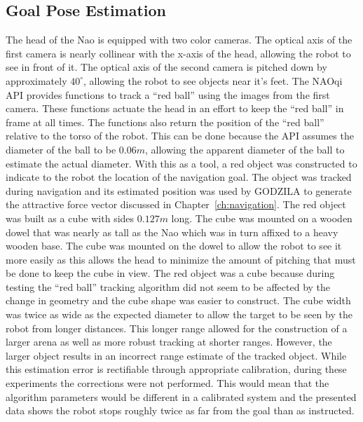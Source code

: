 \subsection{Goal Pose Estimation} \label{subsec:goal_pose_est}
The head of the Nao is equipped with two color cameras. The optical axis of the
first camera is nearly collinear with the x-axis of the head, allowing the
robot to see in front of it. The optical axis of the second camera is pitched
down by approximately $40^\circ$, allowing the robot to see objects near it's feet.
The NAOqi API provides functions to track a ``red ball'' using the images from the first camera. 
These functions actuate the head in an effort to keep the ``red ball'' in frame at all times.
The functions also return the position of the ``red ball'' relative to the torso of the robot.
This can be done because the API assumes the diameter of the ball to be $0.06 m$, allowing
the apparent diameter of the ball to estimate the actual diameter.
With this as a tool, a red object was constructed to indicate to the robot the location of the
navigation goal. The object was tracked during navigation and its estimated position was used
by GODZILA to generate the attractive force vector discussed in Chapter~\ref{ch:navigation}.
The red object was built as a cube with sides $0.127 m$ long. The cube was
mounted on a wooden dowel that was nearly as tall as the Nao which was in turn
affixed to a heavy wooden base.
The cube was mounted on the dowel to allow the robot to see it more easily as this
allows the head to minimize the amount of pitching that must be done to keep the cube in view.
The red object was a cube because during testing the ``red ball'' tracking algorithm did not
seem to be affected by the change in geometry and the cube shape was easier to construct.
The cube width was twice as wide as the expected diameter to allow the target to be seen 
by the robot from longer distances. This longer range allowed for the construction of
a larger arena as well as more robust tracking at shorter ranges.
However, the larger object results in an incorrect range estimate of the tracked object.
While this estimation error is rectifiable through appropriate calibration,
during these experiments the corrections were not performed.
This would mean that the algorithm parameters would be different in a calibrated system
and the presented data shows the robot stops roughly twice as far from the goal than as
instructed.

